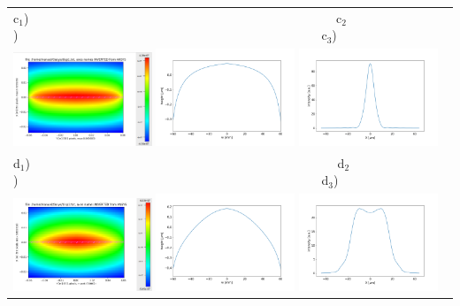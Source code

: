 \documentclass[aps,pra,showpacs,twocolumn,amsmath,amssymb,superscriptaddress,nofootinbib]{revtex4}
\begin{document}
\begin{center}
\begin{tabular}{l}
   c$_1$)~~~~~~~~~~~~~~~~~~~~~~~~~~~~~~~~~~~~~~~~~~~~~~~~~
   c$_2$)~~~~~~~~~~~~~~~~~~~~~~~~~~~~~~~~~~~~~~~~~~~~~~~~~c$_3$)\\
   \includegraphics[width=0.32\textwidth]{figures/water1_2d.png}
   \includegraphics[width=0.32\textwidth]{figures/deformation3.png}
   \includegraphics[width=0.32\textwidth]{figures/intensity3.png} \\


   d$_1$)~~~~~~~~~~~~~~~~~~~~~~~~~~~~~~~~~~~~~~~~~~~~~~~~~
   d$_2$)~~~~~~~~~~~~~~~~~~~~~~~~~~~~~~~~~~~~~~~~~~~~~~~~~d$_3$)\\
   \includegraphics[width=0.32\textwidth]{figures/water2_2d.png}
   \includegraphics[width=0.32\textwidth]{figures/deformation4.png}
   \includegraphics[width=0.32\textwidth]{figures/intensity4.png}\\

   \end{tabular}
  \end{center}
\end{document}
